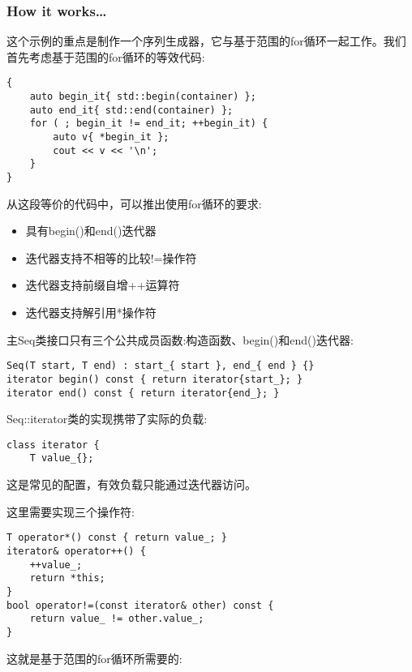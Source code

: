 \subsubsection{How it works…}

这个示例的重点是制作一个序列生成器，它与基于范围的for循环一起工作。我们首先考虑基于范围的for循环的等效代码:

\begin{lstlisting}[style=styleCXX]
{
	auto begin_it{ std::begin(container) };
	auto end_it{ std::end(container) };
	for ( ; begin_it != end_it; ++begin_it) {
		auto v{ *begin_it };
		cout << v << '\n';
	}
}
\end{lstlisting}

从这段等价的代码中，可以推出使用for循环的要求:

\begin{itemize}
\item 
具有begin()和end()迭代器

\item 
迭代器支持不相等的比较!=操作符

\item 
迭代器支持前缀自增++运算符

\item 
迭代器支持解引用*操作符
\end{itemize}

主Seq类接口只有三个公共成员函数:构造函数、begin()和end()迭代器:

\begin{lstlisting}[style=styleCXX]
Seq(T start, T end) : start_{ start }, end_{ end } {}
iterator begin() const { return iterator{start_}; }
iterator end() const { return iterator{end_}; }
\end{lstlisting}

Seq::iterator类的实现携带了实际的负载:

\begin{lstlisting}[style=styleCXX]
class iterator {
	T value_{};
\end{lstlisting}

这是常见的配置，有效负载只能通过迭代器访问。

这里需要实现三个操作符:

\begin{lstlisting}[style=styleCXX]
T operator*() const { return value_; }
iterator& operator++() {
	++value_;
	return *this;
}
bool operator!=(const iterator& other) const {
	return value_ != other.value_;
}
\end{lstlisting}

这就是基于范围的for循环所需要的:


